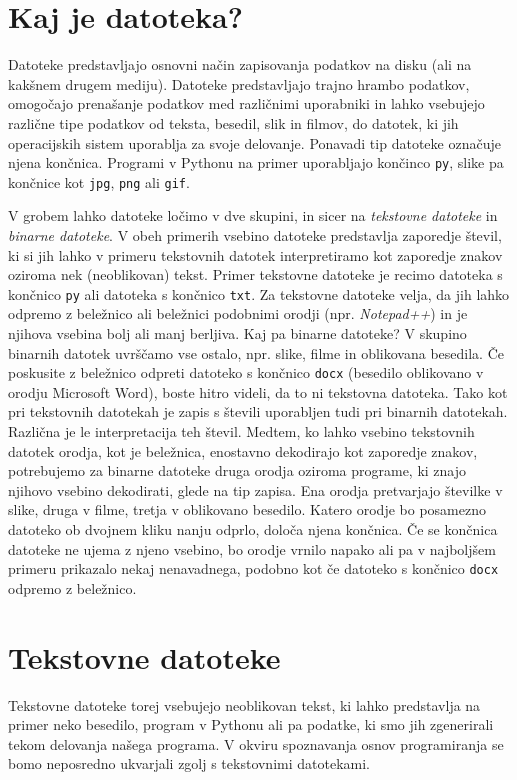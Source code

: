 \section{Kaj je datoteka?}

Datoteke predstavljajo osnovni način zapisovanja podatkov na disku (ali na kakšnem drugem mediju). Datoteke predstavljajo trajno hrambo podatkov, omogočajo prenašanje podatkov med različnimi uporabniki in lahko vsebujejo različne tipe podatkov od teksta, besedil, slik in filmov, do datotek, ki jih operacijskih sistem uporablja za svoje delovanje. Ponavadi tip datoteke označuje njena končnica. Programi v Pythonu na primer uporabljajo končinco \texttt{py}, slike pa končnice kot \texttt{jpg}, \texttt{png} ali \texttt{gif}. 

V grobem lahko datoteke ločimo v dve skupini, in sicer na \emph{tekstovne datoteke} in \emph{binarne datoteke}. V obeh primerih vsebino datoteke predstavlja zaporedje števil, ki si jih lahko v primeru tekstovnih datotek interpretiramo kot zaporedje znakov oziroma nek (neoblikovan) tekst. Primer tekstovne datoteke je recimo datoteka s končnico \texttt{py} ali datoteka s končnico \texttt{txt}. Za tekstovne datoteke velja, da jih lahko odpremo z beležnico ali beležnici podobnimi orodji (npr. \emph{Notepad++}) in je njihova vsebina bolj ali manj berljiva. Kaj pa binarne datoteke? V skupino binarnih datotek uvrščamo vse ostalo, npr. slike, filme in oblikovana besedila. Če poskusite z beležnico odpreti datoteko s končnico \texttt{docx} (besedilo oblikovano v orodju Microsoft Word), boste hitro videli, da to ni tekstovna datoteka. Tako kot pri tekstovnih datotekah je zapis s števili uporabljen tudi pri binarnih datotekah. Različna je le interpretacija teh števil. Medtem, ko lahko vsebino tekstovnih datotek orodja, kot je beležnica, enostavno dekodirajo kot zaporedje znakov, potrebujemo za binarne datoteke druga orodja oziroma programe, ki znajo njihovo vsebino dekodirati, glede na tip zapisa. Ena orodja pretvarjajo številke v slike, druga v filme, tretja v oblikovano besedilo. Katero orodje bo posamezno datoteko ob dvojnem kliku nanju odprlo, določa njena končnica. Če se končnica datoteke ne ujema z njeno vsebino, bo orodje vrnilo napako ali pa v najboljšem primeru prikazalo nekaj nenavadnega, podobno kot če datoteko s končnico \texttt{docx} odpremo z beležnico. 

\section{Tekstovne datoteke}
Tekstovne datoteke torej vsebujejo neoblikovan tekst, ki lahko predstavlja na primer neko besedilo, program v Pythonu ali pa podatke, ki smo jih zgenerirali tekom delovanja našega programa. V okviru spoznavanja osnov programiranja se bomo neposredno ukvarjali zgolj s tekstovnimi datotekami. 

